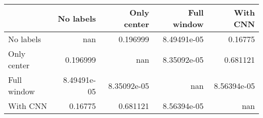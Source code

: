 \begin{tabular}{lrrrr}
\toprule
             &     No labels &   Only center &   Full window &      With CNN \\
\midrule
 No labels   & nan           &   0.196999    &   8.49491e-05 &   0.16775     \\
 Only center &   0.196999    & nan           &   8.35092e-05 &   0.681121    \\
 Full window &   8.49491e-05 &   8.35092e-05 & nan           &   8.56394e-05 \\
 With CNN    &   0.16775     &   0.681121    &   8.56394e-05 & nan           \\
\bottomrule
\end{tabular}